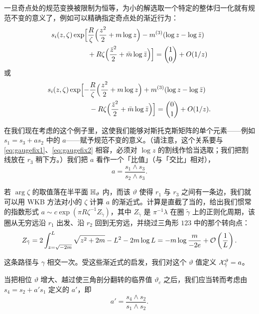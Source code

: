 一旦奇点处的规范变换被限制为恒等，为小的解选取一个特定的整体归一化就有规范不变的意义了，例如可以精确指定奇点处的渐近行为：
\begin{equation} \label{eq:gaugefix1}
\begin{split}
s_i(z,\zeta) \exp \Bigl[ &\frac{R}{\zeta}\Bigl(\frac{z^2}{2} + m \log z\Bigr)
-m^{(3)} (\log z - \log \bar z) \\
&+ R\zeta\Bigl(\frac{\bar z^2}{2} + \bar m \log \bar z\Bigr)\Bigr]
= \binom{1}{0} + O(1/z)
\end{split}
\end{equation}
或
\begin{equation} \label{eq:gaugefix2}
\begin{split}
s_i(z,\zeta) \exp \Bigl[ - &\frac{R}{\zeta}\Bigl(\frac{z^2}{2} + m \log z\Bigr)
+m^{(3)} (\log z - \log \bar z) \\
&- R\zeta\Bigl(\frac{\bar z^2}{2} + \bar m \log \bar z\Bigr)\Bigr]
= \binom{0}{1} + O(1/z).
\end{split}
\end{equation}

在我们现在考虑的这个例子里，这使我们能够对斯托克斯矩阵的单个元素——例如 $s_1 = s_3 + a s_2$ 中的 $a$——赋予规范不变的意义。（请注意，这个关系要与 \eqref{eq:gaugefix1}、\eqref{eq:gaugefix2} 相容，必须对 $\log z$ 的割线作恰当选取；我们把割线放在 $r_3$ 稍下方。）我们把 $a$ 看作一个「比值」（与「交比」相对），
\begin{equation}
a = \frac{s_1 \wedge s_3}{s_2 \wedge s_3}. \label{eq:ratio-a}
\end{equation}

若 $\arg \zeta$ 的取值落在半平面 ${\mathbb{H}}_\vartheta$ 内，而该 $\vartheta$ 使得 $r_1$ 与 $r_3$ 之间有一条边，我们就可以用 WKB 方法对小的 $\zeta$ 计算 $a$ 的渐近式。计算是直截了当的，给出我们惯常的指数形式 $a \sim c \exp (\pi R \zeta^{-1} Z_{\tilde\gamma})$，其中 $Z_{\tilde\gamma}$ 是 $\pi^{-1} \lambda$ 在圈 $\tilde \gamma$ 上的正则化周期，该圈从无穷远沿 $r_1$ 出发、沿 $r_2$ 回到无穷远，并绕过三角形 $123$ 中的那个转向点：
\begin{equation}
Z_{\tilde \gamma} = 2 \int_{z=\sqrt{-2m}}^L \sqrt{z^2 + 2 m}  - L^2-2m \log L = - m \log \frac{m}{-2e} + \mathcal{O}\left(\frac{1}{L}\right). \label{eq:Zgamma-tilde}
\end{equation}

这条路径与 $\gamma$ 相交一次。受这些渐近式的启发，我们对这个 $\vartheta$ 值定义 $\mathcal{X}^\vartheta_{\tilde \gamma} = a$。

当把相位 $\vartheta$ 增大、越过使三角剖分翻转的临界值 $\vartheta_c$ 之后，我们应当转而考虑由 $s_4 = s_2 + a' s_1$ 定义的 $a'$，即
\begin{equation}
a' = \frac{s_4 \wedge s_2}{s_1 \wedge s_2}. \label{eq:aprime}
\end{equation}

